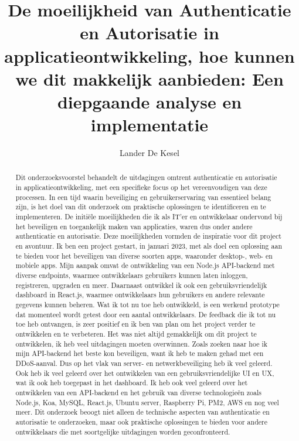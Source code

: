 \documentclass{hogent-article}
\title{De moeilijkheid van Authenticatie en Autorisatie in applicatieontwikkeling, hoe kunnen we dit makkelijk aanbieden: Een diepgaande analyse en implementatie}
\author{Lander De Kesel}
\begin{document}
\begin{abstract}
  Dit onderzoeksvoorstel behandelt de uitdagingen omtrent authenticatie en autorisatie in applicatieontwikkeling, met een specifieke focus op het 
  vereenvoudigen van deze processen. In een tijd waarin beveiliging en gebruikerservaring van essentieel belang zijn, is het doel van dit 
  onderzoek om praktische oplossingen te identificeren en te implementeren.
  \newline
  \newline
  De initiële moeilijkheden die ik als IT'er en ontwikkelaar ondervond bij het beveiligen en toegankelijk maken van applicaties, waren dus onder andere
  authenticatie en autorisatie. Deze moeilijkheden vormden de inspiratie voor dit project en avontuur.
  \newline
  \newline
  Ik ben een project gestart, in januari 2023, met als doel een oplossing aan te bieden voor het beveiligen van diverse 
  soorten apps, waaronder desktop-, web- en mobiele apps. Mijn aanpak omvat de ontwikkeling van een Node.js API-backend met diverse endpoints, 
  waarmee ontwikkelaars gebruikers kunnen laten inloggen, registreren, upgraden en meer. Daarnaast ontwikkel ik ook een gebruiksvriendelijk dashboard 
  in React.js, waarmee ontwikkelaars hun gebruikers en andere relevante gegevens kunnen beheren. Wat ik tot nu toe heb ontwikkeld, is een werkend 
  prototype dat momenteel wordt getest door een aantal ontwikkelaars. De feedback die ik tot nu toe heb ontvangen, is zeer positief en ik ben van 
  plan om het project verder te ontwikkelen en te verbeteren. Het was niet altijd gemakkelijk om dit project te ontwikkelen, ik heb veel uitdagingen 
  moeten overwinnen. Zoals zoeken naar hoe ik mijn API-backend het beste kon beveiligen, want ik heb te maken gehad met een DDoS-aanval. Dus op het 
  vlak van server- en netwerkbeveiliging heb ik veel geleerd. Ook heb ik veel geleerd over het ontwikkelen van een gebruiksvriendelijke UI en UX, 
  wat ik ook heb toegepast in het dashboard. Ik heb ook veel geleerd over het ontwikkelen van een API-backend en het gebruik van diverse technologieën 
  zoals Node.js, Koa, MySQL, React.js, Ubuntu server, Raspberry Pi, PM2, AWS en nog veel meer.
  \newline
  \newline
  Dit onderzoek beoogt niet alleen de technische aspecten van authenticatie en autorisatie te onderzoeken, maar ook praktische oplossingen te bieden voor 
  andere ontwikkelaars die met soortgelijke uitdagingen worden geconfronteerd.
\end{abstract}

\tableofcontents



\printbibliography[heading=bibintoc]
\end{document}
